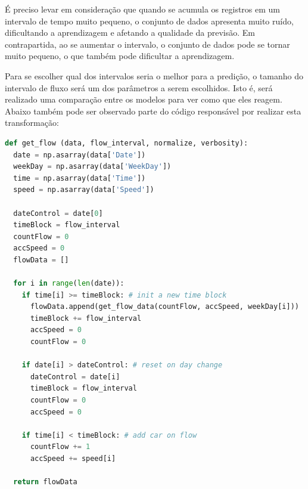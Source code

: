 É preciso levar em consideração que quando se acumula os registros em um intervalo de tempo muito pequeno, o conjunto de dados apresenta muito ruído, dificultando a aprendizagem e afetando a qualidade da previsão. Em contrapartida, ao se aumentar o intervalo, o conjunto de dados pode se tornar muito pequeno, o que também pode dificultar a aprendizagem.

Para se escolher qual dos intervalos seria o melhor para a predição, o tamanho do intervalo de fluxo será um dos parâmetros a serem escolhidos. Isto é, será realizado uma comparação entre os modelos para ver como que eles reagem. Abaixo também pode ser observado parte do código responsável por realizar esta transformação:

\begin{algorithm}[H]
\caption{Como escrever algoritmos no \LaTeX2e}
\end{algorithm}

\begin{lstlisting}[language=Python, caption = GetFlow Python Function]
def get_flow (data, flow_interval, normalize, verbosity):
  date = np.asarray(data['Date'])
  weekDay = np.asarray(data['WeekDay'])
  time = np.asarray(data['Time'])
  speed = np.asarray(data['Speed'])
  
  dateControl = date[0]
  timeBlock = flow_interval
  countFlow = 0
  accSpeed = 0
  flowData = []

  for i in range(len(date)):
    if time[i] >= timeBlock: # init a new time block
      flowData.append(get_flow_data(countFlow, accSpeed, weekDay[i])) 
      timeBlock += flow_interval
      accSpeed = 0
      countFlow = 0
      
    if date[i] > dateControl: # reset on day change
      dateControl = date[i]
      timeBlock = flow_interval 
      countFlow = 0
      accSpeed = 0
      
    if time[i] < timeBlock: # add car on flow
      countFlow += 1
      accSpeed += speed[i]

  return flowData

\end{lstlisting}

